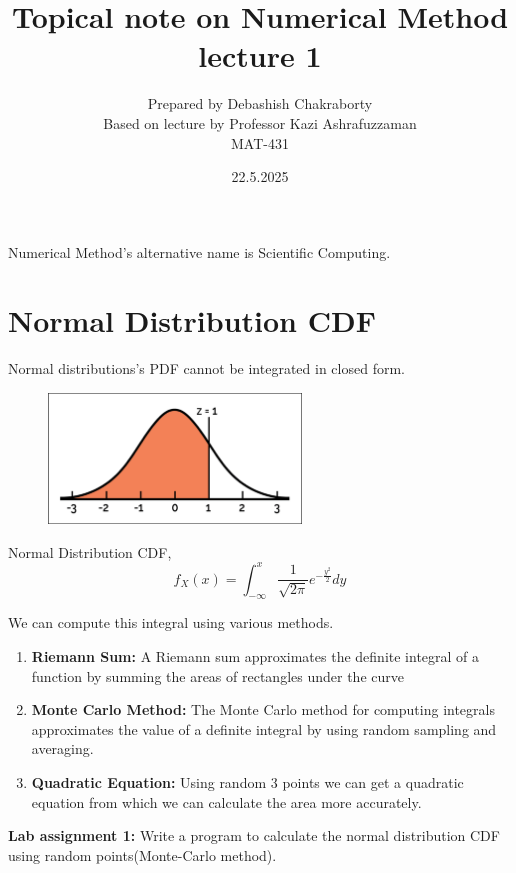 \documentclass{article}
\title{\huge Topical note on Numerical Method lecture 1}
\author{Prepared by Debashish Chakraborty \\
Based on lecture by Professor Kazi Ashrafuzzaman \\
MAT-431}
\date{22.5.2025}
\begin{document}
\maketitle
Numerical Method's alternative name is Scientific Computing. 

\section{Normal Distribution CDF}
Normal distributions's PDF cannot be integrated in closed form.
\begin{figure}[htbp]
  \centering
  \includegraphics[width=0.6\textwidth]{Normal_Distribution.png}
\end{figure}


Normal Distribution CDF, 
$$f_X(x) = \int_{-\infty}^x \frac{1}{\sqrt{2\pi}}e^{-\frac{y^2}{2}}dy$$

We can compute this integral using various methods. \\
\begin{enumerate}
\item \textbf{Riemann Sum:} A Riemann sum approximates the definite integral of a function by summing the areas of rectangles under the curve

\item \textbf{Monte Carlo Method:} The Monte Carlo method for computing integrals approximates the value of a definite integral by using random sampling and averaging.

\item \textbf{Quadratic Equation:} Using random 3 points we can get a quadratic equation from which we can calculate the area more accurately.

\end{enumerate}

\textbf{Lab assignment 1:}  Write a program to calculate the normal distribution CDF using random points(Monte-Carlo method).
\newpage
\end{document}
